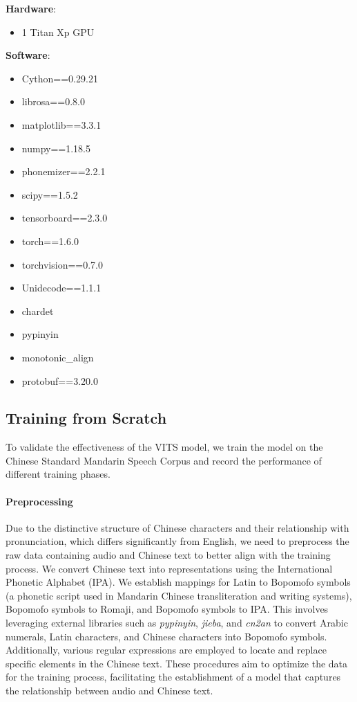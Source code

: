 \documentclass{article}
\begin{document}
\textbf{Hardware}:
\begin{itemize}
    \item 1 Titan Xp GPU
\end{itemize}
\textbf{Software}:
\begin{minipage}{0.45\textwidth}
    \begin{itemize}
        \item Cython==0.29.21
        \item librosa==0.8.0
        \item matplotlib==3.3.1
        \item numpy==1.18.5
        \item phonemizer==2.2.1
        \item scipy==1.5.2
        \item tensorboard==2.3.0
    \end{itemize}
\end{minipage}
\hfill
\begin{minipage}{0.45\textwidth}
    \begin{itemize}
        \item torch==1.6.0
        \item torchvision==0.7.0
        \item Unidecode==1.1.1
    \item chardet
    \item pypinyin
    \item monotonic\_align
    \item protobuf==3.20.0
    \end{itemize}
\end{minipage}
\subsection{Training from Scratch}
To validate the effectiveness of the VITS model, we train the model on the Chinese Standard Mandarin Speech Corpus and record the performance of different training phases.  
\paragraph{Preprocessing}
Due to the distinctive structure of Chinese characters and their relationship with pronunciation, which differs significantly from English, we need to preprocess the raw data containing audio and Chinese text to better align with the training process. We convert Chinese text into representations using the International Phonetic Alphabet (IPA). We establish mappings for Latin to Bopomofo symbols (a phonetic script used in Mandarin Chinese transliteration and writing systems), Bopomofo symbols to Romaji, and Bopomofo symbols to IPA. This involves leveraging external libraries such as \textit{pypinyin}, \textit{jieba}, and \textit{cn2an} to convert Arabic numerals, Latin characters, and Chinese characters into Bopomofo symbols. Additionally, various regular expressions are employed to locate and replace specific elements in the Chinese text. These procedures aim to optimize the data for the training process, facilitating the establishment of a model that captures the relationship between audio and Chinese text.
\end{document}
